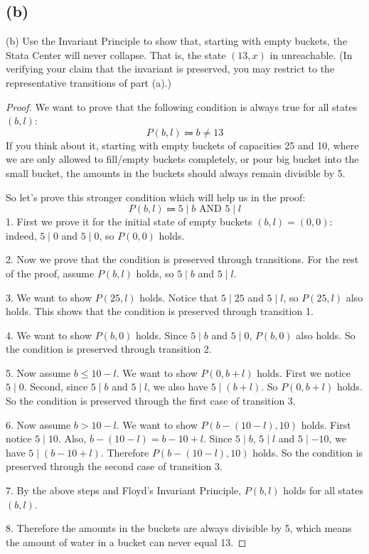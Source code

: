 \documentclass[14pt]{extarticle}
\begin{document}
\subsection{(b)}
(b) Use the Invariant Principle to show that, starting with empty buckets, the Stata Center will never collapse. That is, the state $(13, x)$ in unreachable. (In verifying your claim that the invariant is preserved, you may restrict to the representative transitions of part (a).)
\begin{proof}
We want to prove that the following condition is always true for all states $(b,l)$:
$$
P(b,l) \Coloneqq b \neq 13
$$
If you think about it, starting with empty buckets of capacities 25 and 10, where we are only allowed to fill/empty buckets completely, or pour big bucket into the small bucket, the amounts in the buckets should always remain divisible by 5. 

So let's prove this stronger condition which will help us in the proof:
$$
P(b,l) \Coloneqq 5 \mid b \text{ AND } 5 \mid l
$$
1. First we prove it for the initial state of empty buckets $(b,l) = (0,0)$: indeed, $5 \mid 0$ and $5 \mid 0$, so $P(0,0)$ holds.

2. Now we prove that the condition is preserved through transitions. For the rest of the proof, assume $P(b,l)$ holds, so $5 \mid b$ and $5 \mid l$. 

3. We want to show $P(25, l)$ holds. Notice that $5 \mid 25$ and $5 \mid l$, so $P(25,l)$ also holds. This shows that the condition is preserved through transition 1.

4. We want to show $P(b,0)$ holds. Since $5 \mid b$ and $5 \mid 0$, $P(b,0)$ also holds. So the condition is preserved through transition 2.

5. Now assume $b \leq 10 - l$. We want to show $P(0, b+l)$ holds. First we notice $5 \mid 0$. Second, since $5 \mid b$ and $5 \mid l$, we also have $5 \mid (b+l)$. So $P(0, b+l)$ holds. So the condition is preserved through the first case of transition 3.

6. Now assume $b > 10 - l$. We want to show $P(b - (10-l), 10)$ holds. First notice $5 \mid 10$. Also, $b - (10-l) = b - 10 + l$. Since $5 \mid b$, $5 \mid l$ and $5 \mid -10$, we have $5 \mid (b - 10 + l)$. Therefore $P(b-(10-l), 10)$ holds. So the condition is preserved through the second case of transition 3.

7. By the above steps and Floyd's Invariant Principle, $P(b,l)$ holds for all states $(b,l)$.

8. Therefore the amounts in the buckets are always divisible by 5, which means the amount of water in a bucket can never equal 13.
\end{proof}
\end{document}
